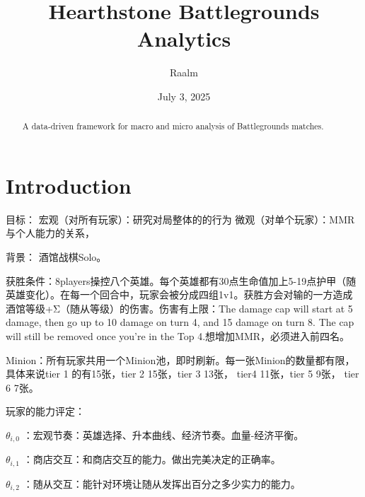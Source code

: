 \documentclass[UTF8]{ctexart}
\title{Hearthstone Battlegrounds Analytics}
\author{Raalm}
\date{July 3, 2025}
\begin{document}
\maketitle

\begin{abstract}
A data‐driven framework for macro and micro analysis of Battlegrounds matches.
\end{abstract}

\section{Introduction}
目标：
宏观（对所有玩家）：研究对局整体的的行为
微观（对单个玩家）：MMR与个人能力的关系，

背景：
酒馆战棋Solo。

获胜条件：8players操控八个英雄。每个英雄都有30点生命值加上5-19点护甲（随英雄变化）。在每一个回合中，玩家会被分成四组1v1。获胜方会对输的一方造成酒馆等级+Σ（随从等级）的伤害。伤害有上限：The damage cap will start at 5 damage, then go up to 10 damage on turn 4, and 15 damage on turn 8. The cap will still be removed once you’re in the Top 4.想增加MMR，必须进入前四名。

Minion：所有玩家共用一个Minion池，即时刷新。每一张Minion的数量都有限，具体来说tier 1 的有15张，tier 2 15张，tier 3 13张， tier4 11张，tier 5 9张， tier 6 7张。

玩家的能力评定：

$\theta_{i,0}$ ：宏观节奏：英雄选择、升本曲线、经济节奏。血量-经济平衡。

$\theta_{i,1}$ ：商店交互：和商店交互的能力。做出完美决定的正确率。

$\theta_{i,2}$ ：随从交互：能针对环境让随从发挥出百分之多少实力的能力。
\end{document}
